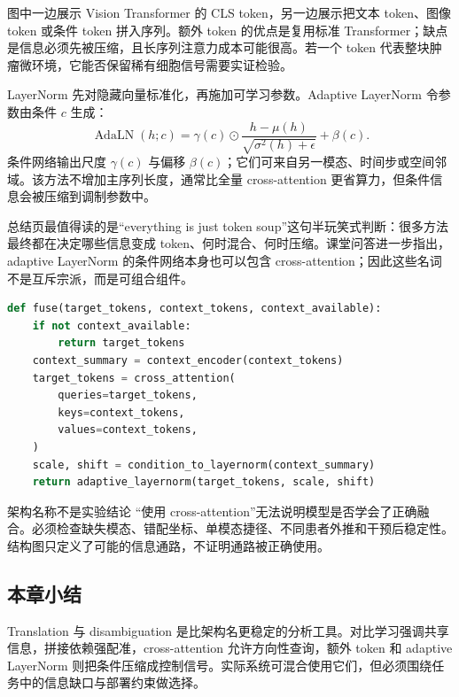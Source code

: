 图中一边展示 Vision Transformer 的 CLS token，另一边展示把文本 token、图像 token 或条件 token 拼入序列。额外 token 的优点是复用标准 Transformer；缺点是信息必须先被压缩，且长序列注意力成本可能很高。若一个 token 代表整块肿瘤微环境，它能否保留稀有细胞信号需要实证检验。


LayerNorm 先对隐藏向量标准化，再施加可学习参数。Adaptive LayerNorm 令参数由条件 $c$ 生成：
\[
\operatorname{AdaLN}(h;c)=\gamma(c)\odot
\frac{h-\mu(h)}{\sqrt{\sigma^2(h)+\epsilon}}+\beta(c).
\]
条件网络输出尺度 $\gamma(c)$ 与偏移 $\beta(c)$；它们可来自另一模态、时间步或空间邻域。该方法不增加主序列长度，通常比全量 cross-attention 更省算力，但条件信息会被压缩到调制参数中。


总结页最值得读的是“everything is just token soup”这句半玩笑式判断：很多方法最终都在决定哪些信息变成 token、何时混合、何时压缩。课堂问答进一步指出，adaptive LayerNorm 的条件网络本身也可以包含 cross-attention；因此这些名词不是互斥宗派，而是可组合组件。

\begin{lstlisting}[language=Python,caption={多模态融合器的统一伪代码：显式保留缺失模态与方向}]
def fuse(target_tokens, context_tokens, context_available):
    if not context_available:
        return target_tokens
    context_summary = context_encoder(context_tokens)
    target_tokens = cross_attention(
        queries=target_tokens,
        keys=context_tokens,
        values=context_tokens,
    )
    scale, shift = condition_to_layernorm(context_summary)
    return adaptive_layernorm(target_tokens, scale, shift)
\end{lstlisting}


\begin{warningbox}{架构名称不是实验结论}
“使用 cross-attention”无法说明模型是否学会了正确融合。必须检查缺失模态、错配坐标、单模态捷径、不同患者外推和干预后稳定性。结构图只定义了可能的信息通路，不证明通路被正确使用。
\end{warningbox}

\subsection{本章小结}

Translation 与 disambiguation 是比架构名更稳定的分析工具。对比学习强调共享信息，拼接依赖强配准，cross-attention 允许方向性查询，额外 token 和 adaptive LayerNorm 则把条件压缩成控制信号。实际系统可混合使用它们，但必须围绕任务中的信息缺口与部署约束做选择。

